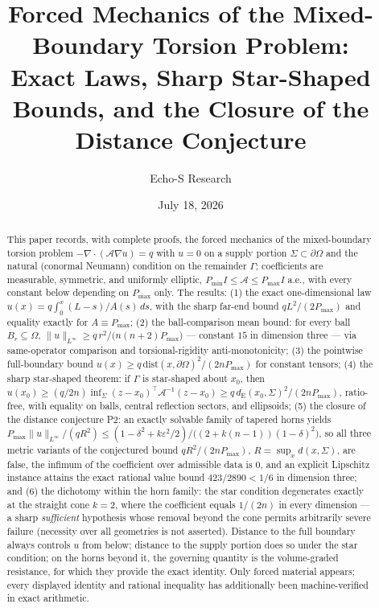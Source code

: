 \documentclass[10pt]{article}
\title{Forced Mechanics of the Mixed-Boundary Torsion Problem:\\
\large Exact Laws, Sharp Star-Shaped Bounds, and the Closure of the Distance
Conjecture}
\author{Echo-S Research}
\date{July 18, 2026}
\theoremstyle{remark}
\newcommand{\A}{\mathcal{A}}
\newcommand{\Om}{\Omega}
\newcommand{\Sig}{\Sigma}
\newcommand{\Gam}{\Gamma}
\newcommand{\Pmax}{P_{\max}}
\newcommand{\Pmin}{P_{\min}}
\newcommand{\dE}{d_{\mathrm{E}}}
\newcommand{\norminf}[1]{\|#1\|_{L^\infty}}
\newcommand{\eps}{\varepsilon}
\begin{document}
\maketitle

\begin{abstract}
This paper records, with complete proofs, the forced mechanics of the
mixed-boundary torsion problem $-\nabla\!\cdot\!(\A\nabla u)=q$ with $u=0$ on a
supply portion $\Sig\subset\partial\Om$ and the natural (conormal Neumann)
condition on the remainder $\Gam$; coefficients are measurable, symmetric,
and uniformly elliptic, $\Pmin I\le\A\le\Pmax I$ a.e., with every constant
below depending on $\Pmax$ only. The results: (1) the exact one-dimensional
law $u(x)=q\int_0^x (L-s)/A(s)\,ds$, with the sharp far-end bound
$qL^2/(2\Pmax)$ and equality exactly for $A\equiv\Pmax$; (2) the ball-comparison
mean bound: for every ball $B_r\subseteq\Om$,
$\norminf{u}\ge q\,r^2/\bigl(n(n+2)\Pmax\bigr)$ --- constant $15$ in dimension
three --- via same-operator comparison and torsional-rigidity anti-monotonicity;
(3) the pointwise full-boundary bound
$u(x)\ge q\,\mathrm{dist}(x,\partial\Om)^2/(2n\Pmax)$ for constant tensors;
(4) the sharp star-shaped theorem: if $\Gam$ is star-shaped about $x_0$, then
$u(x_0)\ge (q/2n)\inf_{\Sig}(z-x_0)^{\!\top}\A^{-1}(z-x_0)\ge
q\,\dE(x_0,\Sig)^2/(2n\Pmax)$, ratio-free, with equality on balls, central
reflection sectors, and ellipsoids; (5) the closure of the distance conjecture
P2: an exactly solvable family of tapered horns yields
$\Pmax\norminf{u}/(qR^2)\le
(1-\delta^2+k\eps^2/2)/\bigl((2+k(n-1))(1-\delta)^2\bigr)$, so all three metric
variants of the conjectured bound $qR^2/(2n\Pmax)$, $R=\sup_x d(x,\Sig)$, are
false, the infimum of the coefficient over admissible data is $0$, and an
explicit Lipschitz instance attains the exact rational value bound
$423/2890<1/6$ in dimension three; and (6) the dichotomy within the horn family: the star
condition degenerates exactly at the straight cone $k=2$, where the
coefficient equals $1/(2n)$ in every dimension --- a sharp \emph{sufficient}
hypothesis whose removal beyond the cone permits arbitrarily severe failure
(necessity over all geometries is not asserted). Distance to the full
boundary always controls $u$ from below; distance to the supply portion does
so under the star condition; on the horns beyond it, the governing quantity is
the volume-graded resistance, for which they provide the exact identity. Only
forced material appears; every displayed identity and rational inequality has
additionally been machine-verified in exact arithmetic.
\end{abstract}
\end{document}
